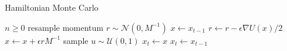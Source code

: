 \begin{algorithm}[H]
    \caption{Hamiltonian Monte Carlo} \label{alg:hmc}
    \begin{algorithmic}
        \Require $n \geq 0$
        \State resample momentum $r \sim \mathcal{N}(0, M^{-1})$
        \State $x \gets x_{t-1}$
        \State $r \gets r - \epsilon \nabla U(x)/2$ 
        \State $x\gets x + \epsilon r M^{-1} $ 
        \EndFor
        \State sample $u \sim \mathcal{U}(0, 1)$
        \State $x_{t} \gets x$
        \Else
        \State $x_{t} \gets x_{t-1}$
        \EndIf
        \EndFor
    \end{algorithmic}
\end{algorithm}


